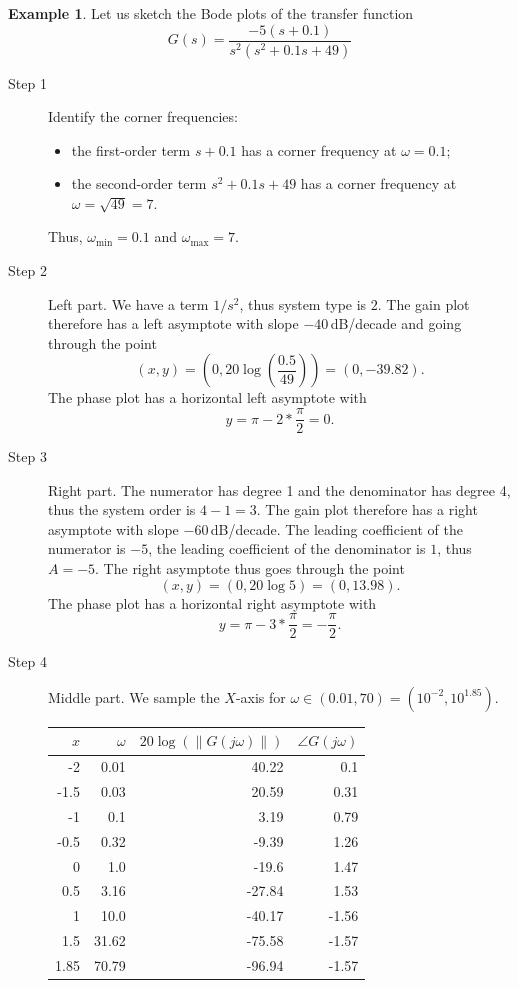 \documentclass[a4paper,11pt]{report}
\theoremstyle{definition}
\newtheorem{mdexample}{Example}
\newenvironment{example}%
  {\vspace{0.1cm}\begin{mdframed}[backgroundcolor=lightgray]\begin{mdexample}}%
  {\end{mdexample}\end{mdframed}\vspace{0.1cm}}
\begin{document}
\begin{example}
  \label{ex:bode-sketch}
  Let us sketch the Bode plots of the transfer function
  \[
  G(s) = \frac{-5(s+0.1)}{s^2(s^2+0.1s+49)}
  \]

  \begin{description}
  \item[Step 1] Identify the corner frequencies:
    \begin{itemize}
    \item the first-order term $s+0.1$ has a corner frequency at
      $\omega=0.1$;
    \item the second-order term $s^2+0.1s+49$ has a corner frequency at
      $\omega=\sqrt{49}=7$. 
    \end{itemize}
    Thus, $\omega_{\min}=0.1$ and $\omega_{\max}=7$.
  \item[Step 2] Left part. We have a term $1/s^2$, thus system type is
    $2$. The gain plot therefore has a left asymptote with slope
    $-40$\,dB/decade and going through the point
    \[
    (x,y)=\left(0,20\log\left(\frac{0.5}{49}\right)\right)=(0,-39.82).
    \]
    The phase plot has a horizontal left asymptote with 
    \[
    y=\pi-2*\frac{\pi}{2}= 0.
    \]
  \item[Step 3] Right part. The numerator has degree 1 and the
    denominator has degree 4, thus the system order is $4-1=3$. The
    gain plot therefore has a right asymptote with slope
    $-60$\,dB/decade. The leading coefficient of the numerator is
    $-5$, the leading coefficient of the denominator is $1$, thus
    $A=-5$. The right asymptote thus goes through the point
    \[
    (x,y)=(0,20\log 5)=(0,13.98).
    \]
    The phase plot has a horizontal right asymptote with 
    \[
    y=\pi-3*\frac{\pi}{2}= -\frac{\pi}{2}.
    \]
  \item[Step 4] Middle part. We sample the $X$-axis for
    $\omega\in(0.01,70)=(10^{-2},10^{1.85})$.
    
  \begin{tabular}{|r|r|r|r|}
    \hline
    $x$ & $\omega$ & $20\log(\|G(j\omega)\|)$ & $\angle G(j\omega)$\\
    \hline
    -2 & 0.01 & 40.22 & 0.1 \\
    -1.5 & 0.03 & 20.59 & 0.31 \\
    -1 & 0.1 & 3.19 & 0.79 \\
    -0.5 & 0.32 & -9.39 & 1.26 \\
    0 & 1.0 & -19.6 & 1.47 \\
    0.5 & 3.16 & -27.84 & 1.53 \\
    1 & 10.0 & -40.17 & -1.56 \\
    1.5 & 31.62 & -75.58 & -1.57 \\
    1.85 & 70.79 & -96.94 & -1.57 \\
    \hline
  \end{tabular}


\end{description}
\end{example}
\end{document}
